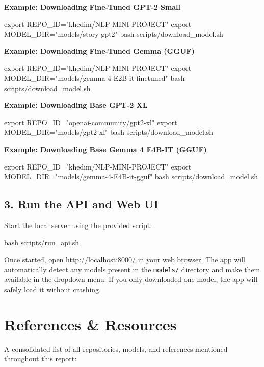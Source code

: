 \documentclass{article}
\begin{document}
\textbf{Example: Downloading Fine-Tuned GPT-2 Small}
\begin{pythoncode}
export REPO_ID="khedim/NLP-MINI-PROJECT"
export MODEL_DIR="models/story-gpt2"
bash scripts/download_model.sh
\end{pythoncode}

\textbf{Example: Downloading Fine-Tuned Gemma (GGUF)}
\begin{pythoncode}
export REPO_ID="khedim/NLP-MINI-PROJECT"
export MODEL_DIR="models/gemma-4-E2B-it-finetuned"
bash scripts/download_model.sh
\end{pythoncode}

\textbf{Example: Downloading Base GPT-2 XL}
\begin{pythoncode}
export REPO_ID="openai-community/gpt2-xl"
export MODEL_DIR="models/gpt2-xl"
bash scripts/download_model.sh
\end{pythoncode}

\textbf{Example: Downloading Base Gemma 4 E4B-IT (GGUF)}
\begin{pythoncode}
export REPO_ID="khedim/NLP-MINI-PROJECT"
export MODEL_DIR="models/gemma-4-E4B-it-gguf"
bash scripts/download_model.sh
\end{pythoncode}

\subsection{3. Run the API and Web UI}
Start the local server using the provided script.

\begin{pythoncode}
bash scripts/run_api.sh
\end{pythoncode}

Once started, open \url{http://localhost:8000/} in your web browser. The app will automatically detect any models present in the \texttt{models/} directory and make them available in the dropdown menu. If you only downloaded one model, the app will safely load it without crashing.

\clearpage
\section{References \& Resources}
\label{sec:references}

A consolidated list of all repositories, models, and references mentioned throughout this report:
\end{document}

